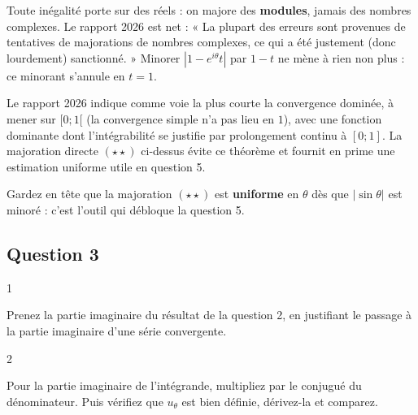 \documentclass[11pt,a4paper]{article}
\begin{document}
\begin{piege}

Toute inégalité porte sur des réels : on majore des \textbf{modules}, jamais des nombres complexes. Le rapport 2026 est net : « La plupart des erreurs sont provenues de tentatives de majorations de nombres complexes, ce qui a été justement (donc lourdement) sanctionné. » Minorer \(|1-e^{i\theta}t|\) par \(1-t\) ne mène à rien non plus : ce minorant s'annule en \(t=1\).

\end{piege}

\begin{jury}

Le rapport 2026 indique comme voie la plus courte la convergence dominée, à mener sur \([0;1[\) (la convergence simple n'a pas lieu en \(1\)), avec une fonction dominante dont l'intégrabilité se justifie par prolongement continu à \([0;1]\). La majoration directe \((\star\star)\) ci-dessus évite ce théorème et fournit en prime une estimation uniforme utile en question 5.

\end{jury}

\begin{methode}

Gardez en tête que la majoration \((\star\star)\) est \textbf{uniforme} en \(\theta\) dès que \(|\sin\theta|\) est minoré : c'est l'outil qui débloque la question 5.

\end{methode}

\hypertarget{question-3}{%
\subsection{Question 3}\label{question-3}}

\begin{indication}{1}

Prenez la partie imaginaire du résultat de la question 2, en justifiant le passage à la partie imaginaire d'une série convergente.

\end{indication}

\begin{indication}{2}

Pour la partie imaginaire de l'intégrande, multipliez par le conjugué du dénominateur. Puis vérifiez que \(u_\theta\) est bien définie, dérivez-la et comparez.

\end{indication}
\end{document}
